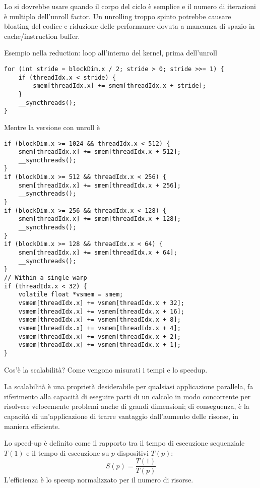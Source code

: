 \begin{questions}
\begin{solution}
    	Lo si dovrebbe usare quando il corpo del ciclo è semplice e il numero di iterazioni è multiplo dell'unroll factor. Un unrolling troppo spinto potrebbe causare bloating del codice e riduzione delle performance dovuta a mancanza di spazio in cache/instruction buffer.
        
        Esempio nella reduction: loop all'interno del kernel, prima dell'unroll
        \begin{verbatim}
for (int stride = blockDim.x / 2; stride > 0; stride >>= 1) {
    if (threadIdx.x < stride) {
        smem[threadIdx.x] += smem[threadIdx.x + stride];
    }
    __syncthreads();
}
        \end{verbatim}
        
        Mentre la versione con unroll è
        \begin{verbatim}
if (blockDim.x >= 1024 && threadIdx.x < 512) {
    smem[threadIdx.x] += smem[threadIdx.x + 512];
    __syncthreads();
}
if (blockDim.x >= 512 && threadIdx.x < 256) {
    smem[threadIdx.x] += smem[threadIdx.x + 256];
    __syncthreads();
}
if (blockDim.x >= 256 && threadIdx.x < 128) {
    smem[threadIdx.x] += smem[threadIdx.x + 128];
    __syncthreads();
}
if (blockDim.x >= 128 && threadIdx.x < 64) {
    smem[threadIdx.x] += smem[threadIdx.x + 64];
    __syncthreads();
}
// Within a single warp
if (threadIdx.x < 32) {
    volatile float *vsmem = smem;
    vsmem[threadIdx.x] += vsmem[threadIdx.x + 32];
    vsmem[threadIdx.x] += vsmem[threadIdx.x + 16];
    vsmem[threadIdx.x] += vsmem[threadIdx.x + 8];
    vsmem[threadIdx.x] += vsmem[threadIdx.x + 4];
    vsmem[threadIdx.x] += vsmem[threadIdx.x + 2];
    vsmem[threadIdx.x] += vsmem[threadIdx.x + 1];
}
        \end{verbatim}
    \end{solution}
    
    \question Cos'è la scalabilità? Come vengono misurati i tempi e lo speedup.
    
    \begin{solution}
    	La scalabilità è una proprietà desiderabile per qualsiasi applicazione parallela, fa riferimento alla capacità di eseguire parti di un calcolo in modo concorrente per risolvere velocemente problemi anche di grandi dimensioni; di conseguenza, è la capacità di un'applicazione di trarre vantaggio dall'aumento delle risorse, in maniera efficiente.
    	
    	 Lo speed-up è definito come il rapporto tra il tempo di esecuzione sequenziale $T(1)$ e il tempo di esecuzione su $p$ dispositivi $T(p)$:
    	 $$ S(p) = \frac{T(1)}{T(p)} $$
    	 L'efficienza è lo speeup normalizzato per il numero di risorse.
    	 

\end{solution}
\end{questions}
